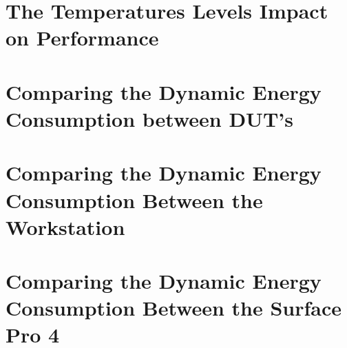 \section{The Temperatures Levels Impact on Performance}\label{app:temperature}
% 
% 
% 


\section{Comparing the Dynamic Energy Consumption between DUT's}\label{app:comparison}
% 
% 

\newpage


\section{Comparing the Dynamic Energy Consumption Between the Workstation}\label{app:comparison_workstation}

% 
% 
\newpage

\section{Comparing the Dynamic Energy Consumption Between the Surface Pro 4}\label{app:comparison_surfacepro4}

